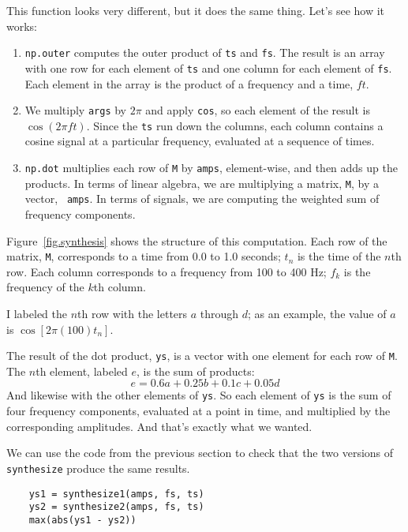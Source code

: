 This function looks very different, but it does the same thing.
Let's see how it works:

\begin{enumerate}
	
	\item {\tt np.outer} computes the outer product of {\tt ts} and
	{\tt fs}.  The result is an array with one row for each element
	of {\tt ts} and one column for each element of {\tt fs}.  Each
	element in the array is the product of a frequency and a time, $f
	t$.
	
	\item We multiply {\tt args} by $2 \pi$ and apply {\tt cos}, so each
	element of the result is $\cos (2 \pi f t)$.  Since the {\tt ts} run
	down the columns, each column contains a cosine signal at a
	particular frequency, evaluated at a sequence of times.
	
	\item {\tt np.dot} multiplies each row of {\tt M} by {\tt amps},
	element-wise, and then adds up the products.  In terms of linear
	algebra, we are multiplying a matrix, {\tt M}, by a vector, {\tt
		amps}.  In terms of signals, we are computing the weighted sum
	of frequency components.
	
\end{enumerate}

Figure~\ref{fig.synthesis} shows the structure of this computation.
Each row of the matrix, {\tt M}, corresponds to a time
from 0.0 to 1.0 seconds; $t_n$ is the time of the $n$th row.
Each column corresponds to a frequency from
100 to 400 Hz; $f_k$ is the frequency of the $k$th column.

I labeled the $n$th row with the letters $a$ through $d$; as an
example, the value of $a$ is $\cos [2 \pi (100) t_n]$.

The result of the dot product, {\tt ys}, is a vector with one element
for each row of {\tt M}.  The $n$th element, labeled $e$, is the sum
of products:
%
\[ e = 0.6 a + 0.25 b + 0.1 c + 0.05 d \]
%
And likewise with the other elements of {\tt ys}.  So each element
of {\tt ys} is the sum of four frequency components, evaluated at
a point in time, and multiplied by the corresponding amplitudes.
And that's exactly what we wanted.

We can use the code from the previous section to check that the two
versions of {\tt synthesize} produce the same results.

\begin{verbatim}
	ys1 = synthesize1(amps, fs, ts)
	ys2 = synthesize2(amps, fs, ts)
	max(abs(ys1 - ys2))
\end{verbatim}

